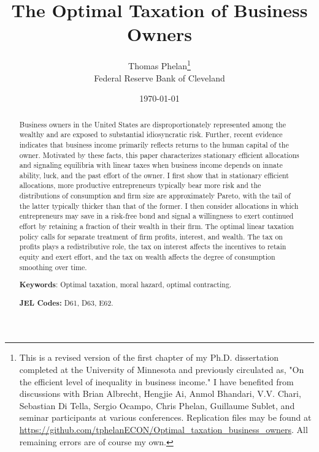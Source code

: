 \documentclass[11pt]{article}
\theoremstyle{plain}
\begin{document}
\title{The Optimal Taxation of Business Owners}
\date{\today} 
\author{Thomas Phelan\thanks{This is a revised version of the first chapter of my Ph.D. dissertation completed at the University of Minnesota and previously circulated as, "On the efficient level of inequality in business income." I have benefited from discussions with Brian Albrecht, Hengjie Ai, Anmol Bhandari, V.V. Chari, Sebastian Di Tella, Sergio Ocampo, Chris Phelan, Guillaume Sublet, and seminar participants at various conferences. Replication files may be found at \href{https://github.com/tphelanECON/Optimal_taxation_business_owners}{https://github.com/tphelanECON/Optimal\_taxation\_business\_owners}. All remaining errors are of course my own.} \\ Federal Reserve Bank of Cleveland}



\maketitle

\begin{abstract} 
Business owners in the United States are disproportionately represented among the wealthy and are exposed to substantial idiosyncratic risk. Further, recent evidence indicates that business income primarily reflects returns to the human capital of the owner. Motivated by these facts, this paper characterizes stationary efficient allocations and signaling equilibria with linear taxes when business income depends on innate ability, luck, and the past effort of the owner. I first show that in stationary efficient allocations, more productive entrepreneurs typically bear more risk and the distributions of consumption and firm size are approximately Pareto, with the tail of the latter typically thicker than that of the former. I then consider allocations in which entrepreneurs may save in a risk-free bond and signal a willingness to exert continued effort by retaining a fraction of their wealth in their firm. The optimal linear taxation policy calls for separate treatment of firm profits, interest, and wealth. The tax on profits plays a redistributive role, the tax on interest affects the incentives to retain equity and exert effort, and the tax on wealth affects the degree of consumption smoothing over time.  

\smallskip

\textbf{Keywords}: Optimal taxation, moral hazard, optimal contracting.

\smallskip

\textbf{JEL Codes:} D61, D63, E62.

\end{abstract}
\end{document}
